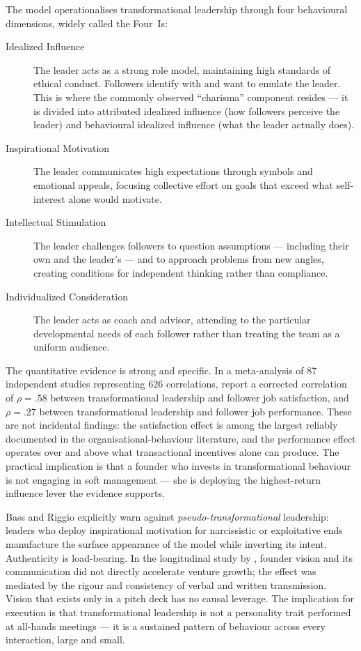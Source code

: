The model operationalises transformational leadership through four behavioural dimensions, widely
called the Four~Is:
\begin{description}
  \item[Idealized Influence] The leader acts as a strong role model, maintaining high standards
    of ethical conduct. Followers identify with and want to emulate the leader. This is where the
    commonly observed ``charisma'' component resides --- it is divided into attributed idealized
    influence (how followers perceive the leader) and behavioural idealized influence (what the
    leader actually does).
  \item[Inspirational Motivation] The leader communicates high expectations through symbols and
    emotional appeals, focusing collective effort on goals that exceed what self-interest alone
    would motivate.
  \item[Intellectual Stimulation] The leader challenges followers to question assumptions ---
    including their own and the leader's --- and to approach problems from new angles, creating
    conditions for independent thinking rather than compliance.
  \item[Individualized Consideration] The leader acts as coach and advisor, attending to the
    particular developmental needs of each follower rather than treating the team as a uniform
    audience.
\end{description}

The quantitative evidence is strong and specific. In a meta-analysis of \num{87} independent
studies representing 626 correlations, \textcite{judge2004transformational} report a corrected
correlation of \(\rho = .58\) between transformational leadership and follower job satisfaction,
and \(\rho = .27\) between transformational leadership and follower job performance. These are
not incidental findings: the satisfaction effect is among the largest reliably documented in
the organisational-behaviour literature, and the performance effect operates over and above what
transactional incentives alone can produce. The practical implication is that a founder who
invests in transformational behaviour is not engaging in soft management --- she is deploying
the highest-return influence lever the evidence supports.

Bass and Riggio explicitly warn against \emph{pseudo-transformational} leadership: leaders who
deploy inspirational motivation for narcissistic or exploitative ends manufacture the surface
appearance of the model while inverting its intent. Authenticity is load-bearing. In the
longitudinal study by \textcite{baum1998longitudinal}, founder vision and its communication did
not directly accelerate venture growth; the effect was mediated by the rigour and consistency of
verbal and written transmission. Vision that exists only in a pitch deck has no causal leverage.
The implication for execution is that transformational leadership is not a personality trait
performed at all-hands meetings --- it is a sustained pattern of behaviour across every
interaction, large and small.

